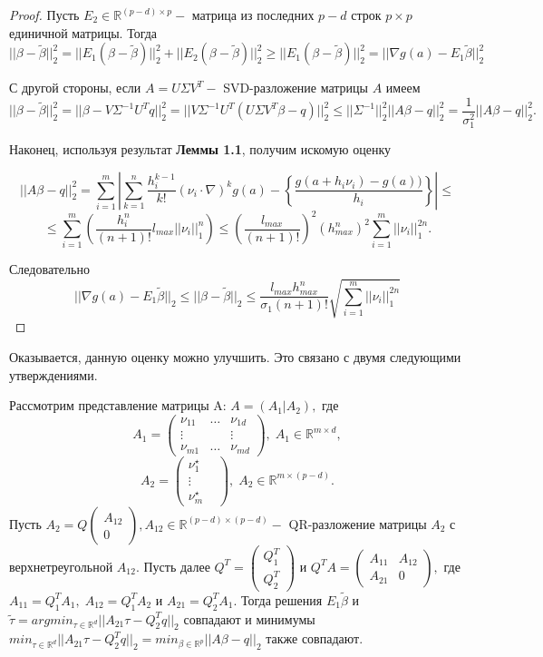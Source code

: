 \documentclass[12 pt, russian]{article}
\begin{document}
\begin{proof}
    Пусть $E_2 \in \mathbb{R}^{(p-d) \times p} - $ матрица из последних $p-d$ строк $p \times p $ единичной матрицы. Тогда
    $$ ||\beta - \tilde{\beta}||_2^2 = ||E_1(\beta - \tilde{\beta})||_2^2 + ||E_2(\beta - \tilde{\beta})||^2_2 \geq ||E_1(\beta - \tilde{\beta})||_2^2 = ||\nabla g(a) - E_1\tilde{\beta}||_2^2$$

    С другой стороны, если $A = U\Sigma V^T - $ SVD-разложение матрицы $A$ имеем
    $$ ||\beta - \tilde{\beta}||^2_2 = ||\beta - V\Sigma^{-1}U^Tq||_2^2 = ||V\Sigma^{-1}U^T(U\Sigma V^T\beta-q)||_2^2 \leq ||\Sigma^{-1}||^2_2||A\beta - q||_2^2 = \frac{1}{\sigma_1^2}||A\beta - q||_2^2.$$

    Наконец, используя результат \textbf{Леммы 1.1}, получим искомую оценку

    $$ ||A\beta - q||_2^2 = \sum_{i=1}^{m}\left| \sum_{k=1}^{n}\frac{h_i^{k-1}}{k!}(\nu_i \cdot \nabla)^k g(a) - \left\{ \frac{g(a+h_i\nu_i)-g(a))}{h_i}\right\}\right| \leq $$
    $$ \leq \sum_{i=1}^{m} \left( \frac{h_i^n}{(n+1)!}l_{max}||\nu_i||_1^n \right) \leq (\frac{l_{max}}{(n+1)!})^2(h^n_{max})^2 \sum_{i=1}^m||\nu_i||_1^{2n}.$$

    Следовательно
    $$ ||\nabla g(a) - E_1\tilde{\beta}||_2 \leq ||\beta-\tilde{\beta} ||_2 \leq \frac{l_{max}h^n_{max}}{\sigma_1(n+1)!}\sqrt{\sum_{i=1}^m||\nu_i||_1^{2n}} $$
\end{proof}

Оказывается, данную оценку можно улучшить. Это связано с двумя следующими утверждениями.
\begin{Statemnt}
Рассмотрим представление матрицы A: $A = (A_1 | A_2),$ где $$
A_1 = \begin{pmatrix}
\nu_{11} & \dots & \nu_{1d}\\
\vdots &       & \vdots \\
\nu_{m1} & \dots & \nu_{md}
\end{pmatrix},\; A_1 \in \mathbb{R}^{m \times d},
$$ $$ A_2 = \begin{pmatrix}
\nu_1^{\star}\\
\vdots &  \\
\nu_m^{\star}
\end{pmatrix},\;  A_2 \in \mathbb{R}^{m \times (p-d)}.$$ Пусть $A_2 = Q\begin{pmatrix}
A_{12}\\
0
\end{pmatrix}, A_{12} \in \mathbb{R}^{(p-d)\times(p-d)}- $ QR-разложение матрицы $A_2$ с верхнетреугольной $A_{12}$. Пусть далее $Q^T = \begin{pmatrix}
Q_1^T\\
Q_2^T
\end{pmatrix} $ и $Q^TA = \begin{pmatrix}
A_{11} & A_{12}\\
A_{21} & 0
\end{pmatrix}, $ где $A_{11} = Q_1^TA_1,\; A_{12} = Q_1^TA_2$ и $A_{21} = Q_2^TA_1$. Тогда решения $E_1 \tilde{\beta}$ и $\tilde{\tau} =  argmin_{\tau \in \mathbb{R}^{d}}||A_{21}\tau - Q_2^Tq||_2$ совпадают и минимумы $min_{\tau \in \mathbb{R}^{d}}||A_{21}\tau - Q_2^Tq||_2 = min_{\beta \in \mathbb{R}^{p}}||A\beta - q||_2$ также совпадают.
\end{Statemnt}
\end{document}
